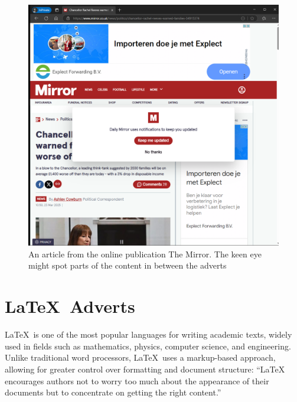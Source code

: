 \documentclass[letterpaper, twocolumn]{article}
\begin{document}
	\begin{figure}[tbh]
	\begin{center}
		\includegraphics[width=1\linewidth]{figs/mirror.png}
		\caption{An article from the online publication The Mirror. The keen eye might spot parts of the content in between the adverts}
		\label{fig:mirror}
	\end{center}
	\end{figure} 
	
	\section{\LaTeX\ Adverts}\label{sec:setup}
	\LaTeX\ is one of the most popular languages for writing academic texts, widely used in fields such as mathematics, physics, computer science, and engineering. Unlike traditional word processors, \LaTeX\ uses a markup-based approach, allowing for greater control over formatting and document structure: \cite{Latex_2025}
	``LaTeX encourages authors not to worry too much about the appearance of their documents but to concentrate on getting the right content.''
	
\end{document}
